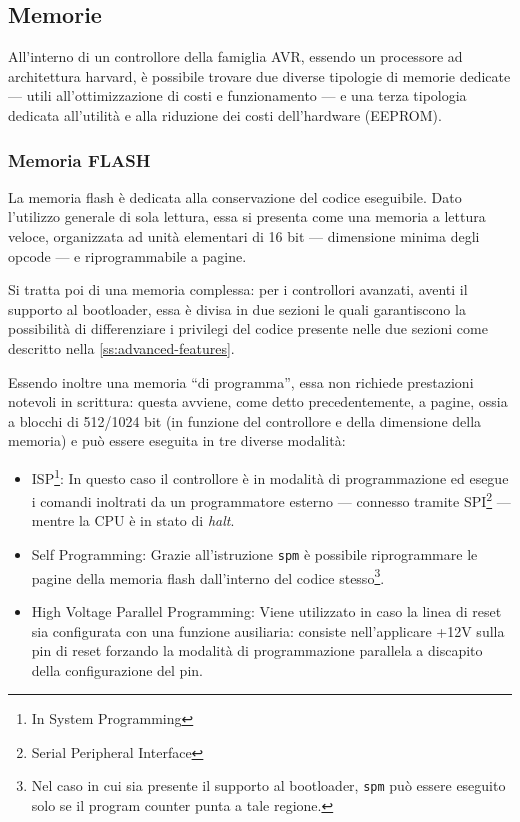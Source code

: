 \subsection{Memorie}

All'interno di un controllore della famiglia AVR, essendo un processore ad architettura harvard, è possibile trovare due diverse tipologie di memorie dedicate --- utili all'ottimizzazione di costi e funzionamento --- e una terza tipologia dedicata all'utilità e alla riduzione dei costi dell'hardware (EEPROM).

\subsubsection{Memoria FLASH}
La memoria flash è dedicata alla conservazione del codice eseguibile.
Dato l'utilizzo generale di sola lettura, essa si presenta come una memoria a lettura veloce, organizzata ad unità elementari di 16 bit --- dimensione minima degli opcode\cite{avr:isa} --- e riprogrammabile a pagine.

Si tratta poi di una memoria complessa: per i controllori avanzati, aventi il supporto al bootloader, essa è divisa in due sezioni le quali garantiscono la possibilità di differenziare i privilegi del codice presente nelle due sezioni come descritto nella \cref{ss:advanced-features}.

Essendo inoltre una memoria ``di programma'', essa non richiede prestazioni notevoli in scrittura: questa avviene, come detto precedentemente, a pagine, ossia a blocchi di 512/1024 bit (in funzione del controllore e della dimensione della memoria) e può essere eseguita in tre diverse modalità:

\begin{itemize}
    \item ISP\footnote{In System Programming}: In questo caso il controllore è in modalità di programmazione ed esegue i comandi inoltrati da un programmatore esterno --- connesso tramite SPI\footnote{Serial Peripheral Interface} --- mentre la CPU è in stato di \textit{halt}.
    \item Self Programming: Grazie all'istruzione \texttt{spm} è possibile riprogrammare le pagine della memoria flash dall'interno del codice stesso\footnote{Nel caso in cui sia presente il supporto al bootloader, \texttt{spm} può essere eseguito solo se il program counter punta a tale regione.}.
    \item High Voltage Parallel Programming: Viene utilizzato in caso la linea di reset sia configurata con una funzione ausiliaria: consiste nell'applicare +12V sulla pin di reset forzando la modalità di programmazione parallela a discapito della configurazione del pin\cite[sec 28.6]{avr:m328p}.
\end{itemize}

